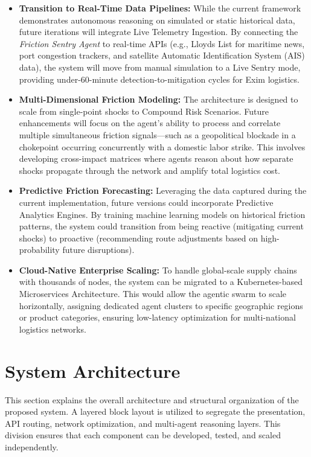 \begin{itemize}
    \item \textbf{Transition to Real-Time Data Pipelines:} While the current framework demonstrates autonomous reasoning on simulated or static historical data, future iterations will integrate Live Telemetry Ingestion. By connecting the \textit{Friction Sentry Agent} to real-time APIs (e.g., Lloyds List for maritime news, port congestion trackers, and satellite Automatic Identification System (AIS) data), the system will move from manual simulation to a Live Sentry mode, providing under-60-minute detection-to-mitigation cycles for Exim logistics.
    \item \textbf{Multi-Dimensional Friction Modeling:} The architecture is designed to scale from single-point shocks to Compound Risk Scenarios. Future enhancements will focus on the agent's ability to process and correlate multiple simultaneous friction signals—such as a geopolitical blockade in a chokepoint occurring concurrently with a domestic labor strike. This involves developing cross-impact matrices where agents reason about how separate shocks propagate through the network and amplify total logistics cost.
    \item \textbf{Predictive Friction Forecasting:} Leveraging the data captured during the current implementation, future versions could incorporate Predictive Analytics Engines. By training machine learning models on historical friction patterns, the system could transition from being reactive (mitigating current shocks) to proactive (recommending route adjustments based on high-probability future disruptions).
    \item \textbf{Cloud-Native Enterprise Scaling:} To handle global-scale supply chains with thousands of nodes, the system can be migrated to a Kubernetes-based Microservices Architecture. This would allow the agentic swarm to scale horizontally, assigning dedicated agent clusters to specific geographic regions or product categories, ensuring low-latency optimization for multi-national logistics networks.
\end{itemize}

\section[System Architecture]{System Architecture}
This section explains the overall architecture and structural organization of the proposed system. A layered block layout is utilized to segregate the presentation, API routing, network optimization, and multi-agent reasoning layers. This division ensures that each component can be developed, tested, and scaled independently.


